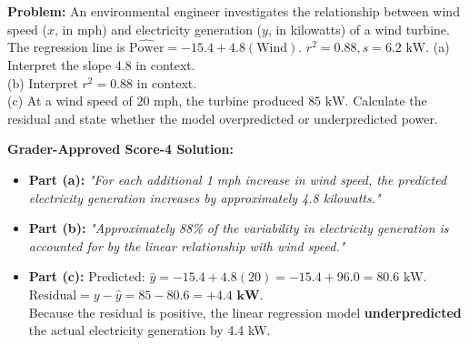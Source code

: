 \begin{workbookbox}
\textbf{Problem:} An environmental engineer investigates the relationship between wind speed ($x$, in mph) and electricity generation ($y$, in kilowatts) of a wind turbine. The regression line is $\widehat{\text{Power}} = -15.4 + 4.8(\text{Wind})$. $r^2 = 0.88, s = 6.2\text{ kW}$.
(a) Interpret the slope $4.8$ in context.\\
(b) Interpret $r^2 = 0.88$ in context.\\
(c) At a wind speed of $20\text{ mph}$, the turbine produced $85\text{ kW}$. Calculate the residual and state whether the model overpredicted or underpredicted power.

\textbf{Grader-Approved Score-4 Solution:}
\begin{itemize}[leftmargin=1.2em]
  \item \textbf{Part (a):} \textit{"For each additional 1 mph increase in wind speed, the predicted electricity generation increases by approximately 4.8 kilowatts."}
  \item \textbf{Part (b):} \textit{"Approximately 88\% of the variability in electricity generation is accounted for by the linear relationship with wind speed."}
  \item \textbf{Part (c):} Predicted: $\hat{y} = -15.4 + 4.8(20) = -15.4 + 96.0 = 80.6\text{ kW}$.\\
  $\text{Residual} = y - \hat{y} = 85 - 80.6 = \mathbf{+4.4\text{ kW}}$.\\
  Because the residual is positive, the linear regression model \textbf{underpredicted} the actual electricity generation by 4.4 kW.
\end{itemize}
\end{workbookbox}



